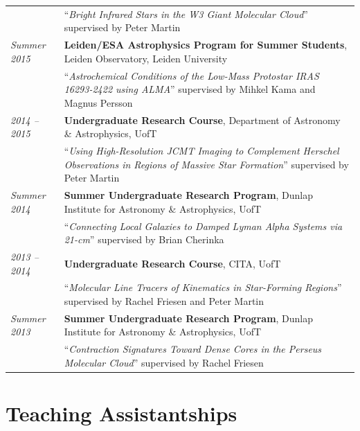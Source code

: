 \documentclass[10pt]{res} %
\begin{document}
\begin{resume}
\begin{table}[h]
\begin{tabularx}{\textwidth}{ @{} p{6.5em} X @{} }
                                  & ``\textit{Bright Infrared Stars in the W3 Giant Molecular Cloud}'' supervised by Peter Martin \\
\textit{Summer 2015} & \textbf{Leiden/ESA Astrophysics Program for Summer Students}, Leiden Observatory, Leiden University \\
                                  & ``\textit{Astrochemical Conditions of the Low-Mass Protostar IRAS 16293-2422 using ALMA}'' supervised by Mihkel Kama and Magnus Persson \\
\textit{2014 -- 2015} & \textbf{Undergraduate Research Course}, Department of Astronomy \& Astrophysics, UofT \\
                                 & ``\textit{Using High-Resolution JCMT Imaging to Complement Herschel Observations in Regions of Massive Star Formation}'' supervised by Peter Martin \\
\textit{Summer 2014} & \textbf{Summer Undergraduate Research Program}, Dunlap Institute for Astronomy \& Astrophysics, UofT \\
                                  & ``\textit{Connecting Local Galaxies to Damped Lyman Alpha Systems via 21-cm}'' supervised by Brian Cherinka \\
\textit{2013 -- 2014} &\textbf{Undergraduate Research Course}, CITA, UofT \\
                                 & ``\textit{Molecular Line Tracers of Kinematics in Star-Forming Regions}'' supervised by Rachel Friesen and Peter Martin \\
\textit{Summer 2013} & \textbf{Summer Undergraduate Research Program}, Dunlap Institute for Astronomy \& Astrophysics, UofT \\
                                  & ``\textit{Contraction Signatures Toward Dense Cores in the Perseus Molecular Cloud}'' supervised by Rachel Friesen
\end{tabularx}
\end{table}


\section{\Large Teaching Assistantships}
\vspace{-5pt} %
\noindent\makebox[\linewidth]{\rule{\textwidth}{0.4pt}}
\vspace{-20pt} %


\end{resume}
\end{document}
